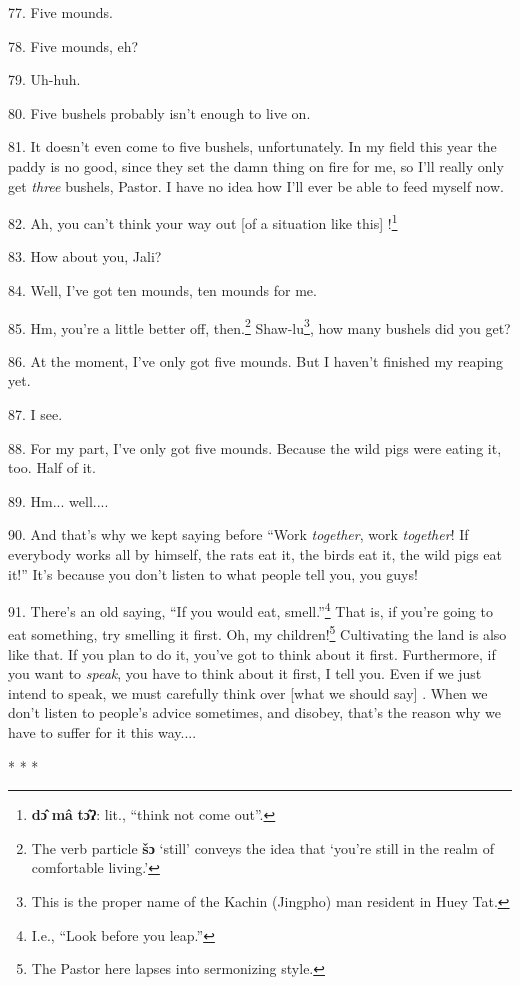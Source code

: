 77. Five mounds.

78. Five mounds, eh?

79. Uh-huh.

80. Five bushels probably isn't enough to live on.

81. It doesn't even come to five bushels, unfortunately. In my field this year
the paddy is no good, since they set the damn thing on fire for me, so I'll really
only get \textit{three} bushels, Pastor. I have no idea how I'll ever be able to
feed myself now.

82. Ah, you can't think your way out [of a situation like this] !\footnote{\textbf{dɔ̂} \textbf{mâ} \textbf{tɔ̂ʔ}: lit., ``think not come out''.}

83. How about you, Jali?

84. Well, I've got ten mounds, ten mounds for me.

85. Hm, you're a little better off, then.\footnote{The verb particle \textbf{šɔ} `still' conveys the idea that `you're still in the realm of comfortable living.'} Shaw-lu\footnote{This is the proper name of the Kachin (Jingpho) man resident in Huey Tat.}, how many bushels
did you get?

86. At the moment, I've only got five mounds. But I haven't finished my reaping
yet.

87. I see.

88. For my part, I've only got five mounds. Because the wild pigs were eating it,
too. Half of it.

89. Hm... well....

90. And that's why we kept saying before ``Work\textit{ together}, work
\textit{together}! If everybody works all by himself, the rats eat it, the birds
eat it, the wild pigs eat it!'' It's because you don't listen to what people
tell you, you guys!

91. There's an old saying, ``If you would eat, smell.''\footnote{I.e., ``Look before you leap.''} That
is, if you're going to eat something, try smelling it first. Oh, my children!\footnote{The Pastor here lapses into sermonizing style.}
Cultivating the land is also like that. If you plan to do it, you've got to think
about it first. Furthermore, if you want to \textit{speak}, you have to think about
it first, I tell you. Even if we just intend to speak, we must carefully think
over [what we should say] . When we don't listen to people's advice sometimes,
and disobey, that's the reason why we have to suffer for it this way....

\begin{center}
* * *
\end{center}

